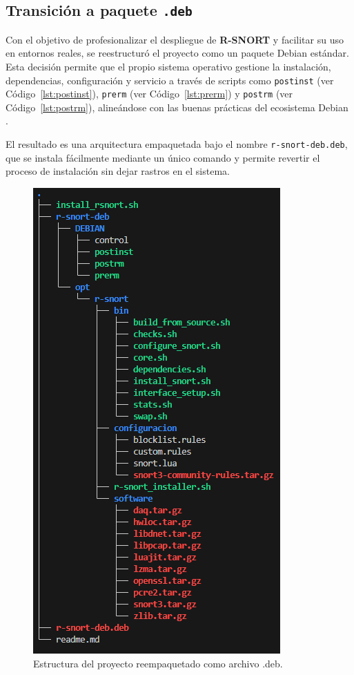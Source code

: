 \documentclass[11pt,a4paper,twoside]{report}
\begin{document}

\subsection{Transición a paquete \texttt{.deb}}

Con el objetivo de profesionalizar el despliegue de \textbf{R-SNORT} y facilitar su uso en entornos reales, se reestructuró el proyecto como un paquete Debian estándar. Esta decisión permite que el propio sistema operativo gestione la instalación, dependencias, configuración y servicio a través de scripts como \texttt{postinst} (ver Código~\ref{lst:postinst}), \texttt{prerm} (ver Código~\ref{lst:prerm}) y \texttt{postrm} (ver Código~\ref{lst:postrm}), alineándose con las buenas prácticas del ecosistema Debian \cite{debian_packaging_guide}.
\newline

El resultado es una arquitectura empaquetada bajo el nombre \texttt{r-snort-deb.deb}, que se instala fácilmente mediante un único comando y permite revertir el proceso de instalación sin dejar rastros en el sistema.

\begin{figure}[H]
	\centering
	\includegraphics[scale=0.8]{script_automatico/13.png}
	\caption{Estructura del proyecto reempaquetado como archivo .deb.}
\end{figure}
\end{document}
